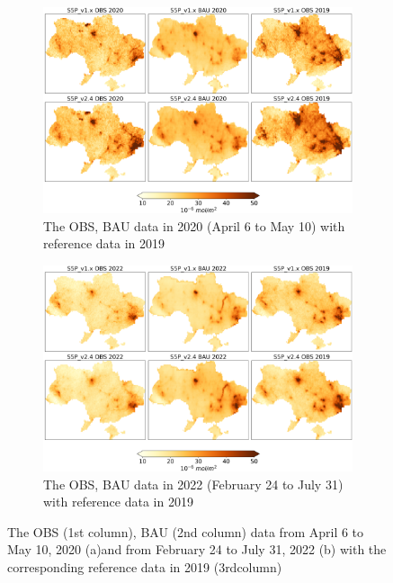 \begin{figure}[p]
    \centering
    \begin{subfigure}{\textwidth}
      \centering
      \includegraphics[width=\textwidth]{figs/chap3/figA3_a.png}
      \caption[Examples of OBS and BAU data in 2020]{The OBS, BAU data in 2020 (April 6 to May 10) with reference data in 2019}
    \end{subfigure}

    \begin{subfigure}{\textwidth}
      \centering
      \includegraphics[width=\textwidth]{figs/chap3/figA3_b.png}
      \caption{The OBS, BAU data in 2022 (February 24 to July 31) with reference data in 2019}
    \end{subfigure}
    \caption[Examples of OBS and BAU data in 2022]{The OBS (1st column), BAU (2nd column) data from April 6 to May 10, 2020 (a)and from February 24 to July 31, 2022 (b) with the corresponding reference data in 2019 (3rdcolumn)}
    \label{fig:chap3_figa3}
\end{figure}

